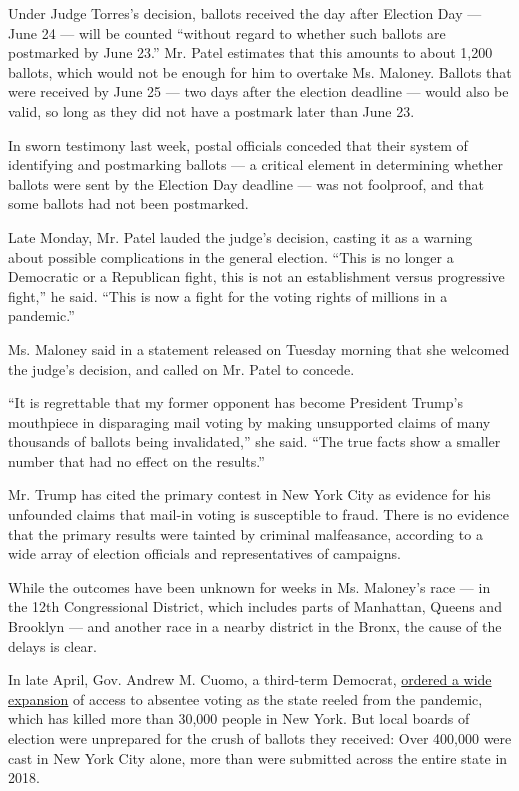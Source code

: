Under Judge Torres's decision, ballots received the day after Election
Day --- June 24 --- will be counted ``without regard to whether such
ballots are postmarked by June 23.'' Mr. Patel estimates that this
amounts to about 1,200 ballots, which would not be enough for him to
overtake Ms. Maloney. Ballots that were received by June 25 --- two days
after the election deadline --- would also be valid, so long as they did
not have a postmark later than June 23.

In sworn testimony last week, postal officials conceded that their
system of identifying and postmarking ballots --- a critical element in
determining whether ballots were sent by the Election Day deadline ---
was not foolproof, and that some ballots had not been postmarked.

Late Monday, Mr. Patel lauded the judge's decision, casting it as a
warning about possible complications in the general election. ``This is
no longer a Democratic or a Republican fight, this is not an
establishment versus progressive fight,'' he said. ``This is now a fight
for the voting rights of millions in a pandemic.''

Ms. Maloney said in a statement released on Tuesday morning that she
welcomed the judge's decision, and called on Mr. Patel to concede.

``It is regrettable that my former opponent has become President Trump's
mouthpiece in disparaging mail voting by making unsupported claims of
many thousands of ballots being invalidated,'' she said. ``The true
facts show a smaller number that had no effect on the results.''

Mr. Trump has cited the primary contest in New York City as evidence for
his unfounded claims that mail-in voting is susceptible to fraud. There
is no evidence that the primary results were tainted by criminal
malfeasance, according to a wide array of election officials and
representatives of campaigns.

While the outcomes have been unknown for weeks in Ms. Maloney's race ---
in the 12th Congressional District, which includes parts of Manhattan,
Queens and Brooklyn --- and another race in a nearby district in the
Bronx, the cause of the delays is clear.

In late April, Gov. Andrew M. Cuomo, a third-term Democrat,
\href{https://www.governor.ny.gov/news/amid-ongoing-covid-19-pandemic-governor-cuomo-issues-executive-order-make-sure-every-new-yorker}{ordered
a wide expansion} of access to absentee voting as the state reeled from
the pandemic, which has killed more than 30,000 people in New York. But
local boards of election were unprepared for the crush of ballots they
received: Over 400,000 were cast in New York City alone, more than were
submitted across the entire state in 2018.

